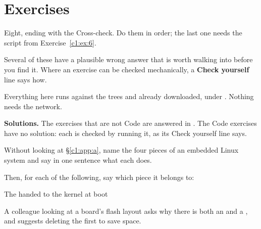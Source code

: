 
\section{Exercises}
\label{c1:sec:exercises}\label{c1:app:c}

\begin{aside}
Eight, ending with the Cross-check. Do them in order; the last one needs the script from
Exercise~\ref{c1:ex:6}.

Several of these have a plausible wrong answer that is worth walking into before you find it. Where
an exercise can be checked mechanically, a \textbf{Check yourself} line says how.

Everything here runs against the trees  and  already downloaded,
under . Nothing needs the network.

\textbf{Solutions.} The exercises that are not Code are answered in . The Code
exercises have no solution: each is checked by running it, as its Check yourself line says.
\end{aside}

\label{c1:ex:1}

Without looking at \S\ref{c1:app:a}, name the four pieces of an embedded Linux system and say in one
sentence what each does.

Then, for each of the following, say which piece it belongs to:

 

 

 

 

 The  handed to the kernel at boot

 

\label{c1:ex:2}

A colleague looking at a board's flash layout asks why there is both an  and a
, and suggests deleting the first to save space.

